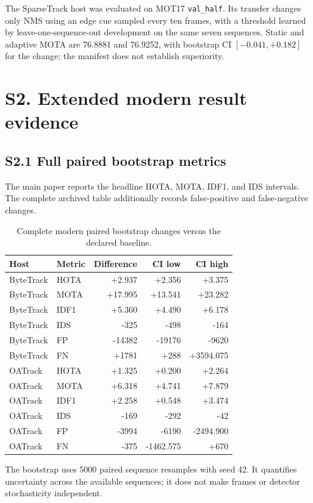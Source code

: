\documentclass[11pt]{article}
\begin{document}
The SparseTrack host was evaluated on MOT17 \texttt{val\_half}. Its transfer changes
only NMS using an edge cue sampled every ten frames, with a threshold learned
by leave-one-sequence-out development on the same seven sequences. Static and
adaptive MOTA are 76.8881 and 76.9252, with bootstrap CI
$[-0.041,+0.182]$ for the change; the manifest does not establish superiority.

\section*{S2. Extended modern result evidence}

\subsection*{S2.1 Full paired bootstrap metrics}
The main paper reports the headline HOTA, MOTA, IDF1, and IDS intervals.
The complete archived table additionally records false-positive and
false-negative changes.

\begin{table}[ht]
\centering\scriptsize
\caption{Complete modern paired bootstrap changes versus the declared baseline.}
\label{tab:s2-bootstrap}
\begin{tabular}{llrrr}
\toprule
Host & Metric & Difference & CI low & CI high\\
\midrule
ByteTrack & HOTA & +2.937 & +2.356 & +3.375\\
ByteTrack & MOTA & +17.995 & +13.541 & +23.282\\
ByteTrack & IDF1 & +5.360 & +4.490 & +6.178\\
ByteTrack & IDS & -325 & -498 & -164\\
ByteTrack & FP & -14382 & -19176 & -9620\\
ByteTrack & FN & +1781 & +288 & +3594.075\\
OATrack & HOTA & +1.325 & +0.200 & +2.264\\
OATrack & MOTA & +6.318 & +4.741 & +7.879\\
OATrack & IDF1 & +2.258 & +0.548 & +3.474\\
OATrack & IDS & -169 & -292 & -42\\
OATrack & FP & -3994 & -6190 & -2494.900\\
OATrack & FN & -375 & -1462.575 & +670\\
\bottomrule
\end{tabular}
\end{table}

The bootstrap uses 5000 paired sequence resamples with seed 42. It quantifies
uncertainty across the available sequences; it does not make frames or
detector stochasticity independent.
\end{document}
